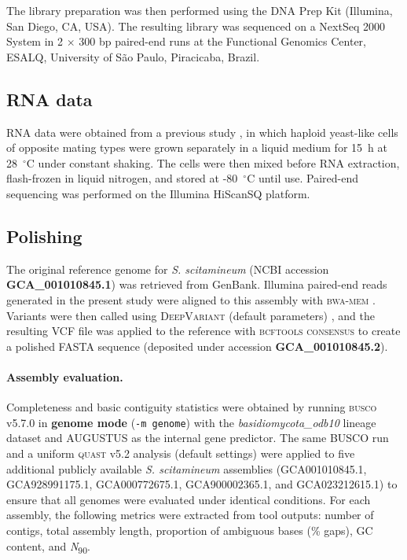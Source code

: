 \documentclass[Journal,letterpaper]{ascelike-new}
\begin{document}
The library preparation was then performed using the DNA Prep Kit (Illumina, San Diego, CA, USA). The resulting library was sequenced on a NextSeq 2000 System in 2 $\times$ 300 bp paired-end runs at the Functional Genomics Center, ESALQ, University of São Paulo, Piracicaba, Brazil.

\subsection*{RNA data}

RNA data were obtained from a previous study \cite{sscita2015}, in which haploid yeast-like cells of opposite mating types were grown separately in a liquid medium for 15~h at 28~$^{\circ}$C under constant shaking. The cells were then mixed before RNA extraction, flash-frozen in liquid nitrogen, and stored at -80~$^{\circ}$C until use. Paired-end sequencing was performed on the Illumina HiScanSQ platform.

\subsection*{Polishing}

The original reference genome for \textit{S. scitamineum} (NCBI accession \textbf{GCA\_001010845.1}) \cite{sscita2015} was retrieved from GenBank. Illumina paired-end reads generated in the present study were aligned to this assembly with \textsc{bwa-mem} \cite{bwamem}. Variants were then called using \textsc{DeepVariant} (default parameters) \cite{deepvariant2018}, and the resulting VCF file was applied to the reference with \textsc{bcftools consensus} \cite{samtools} to create a polished FASTA sequence (deposited under accession \textbf{GCA\_001010845.2}).

\paragraph{Assembly evaluation.} Completeness and basic contiguity statistics were obtained by running \textsc{busco} v5.7.0 \cite{busco} in \textbf{genome mode} (\texttt{-m genome}) with the \textit{basidiomycota\_odb10} lineage dataset and \textsc{AUGUSTUS} as the internal gene predictor. The same BUSCO run and a uniform \textsc{quast} v5.2 analysis (default settings) were applied to five additional publicly available \textit{S. scitamineum} assemblies (GCA001010845.1, GCA928991175.1, GCA000772675.1, GCA900002365.1, and GCA023212615.1) to ensure that all genomes were evaluated under identical conditions. For each assembly, the following metrics were extracted from tool outputs: number of contigs, total assembly length, proportion of ambiguous bases (\% gaps), GC content, and \textit{N}\textsubscript{90}.
\end{document}
